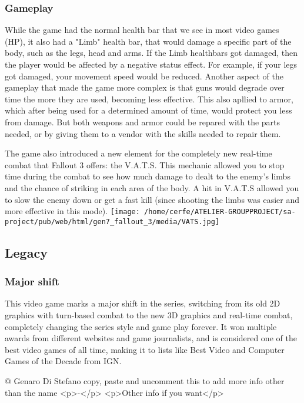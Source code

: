 \documentclass[a4paper,10pt]{book}
\begin{document}
 \subsubsection{Gameplay }
 
          While the game had the normal health bar that we see in most video games (HP), it also had a "Limb" health bar, that would damage a specific part of the body, such as the legs, head and arms. If the Limb healthbars got damaged, then the player would be affected by a negative status effect. For example, if your legs got damaged, your movement speed would be reduced. Another aspect of the gameplay that made the game more complex is that guns would degrade over time the more they are used, becoming less effective. This also apllied to armor, which after being used for a determined amount of time, would protect you less from damage. But both weapons and armor could be repared with the parts needed, or by giving them to a vendor with the skills needed to repair them.
         
 The game also introduced a new element for the completely new real-time combat that Fallout 3 offers: the V.A.T.S. This mechanic allowed you to stop time during the combat to see how much damage to dealt to the enemy's limbs and the chance of striking in each area of the body. A hit in V.A.T.S allowed you to slow the enemy down or get a fast kill (since shooting the limbs was easier and more effective in this mode). 
 \texttt{[image: /home/cerfe/ATELIER-GROUPPROJECT/sa-project/pub/web/html/gen7\_fallout\_3/media/VATS.jpg]}  
 \subsection{Legacy }
 \subsubsection{Major shift }
 
        This video game marks a major shift in the series, switching from its old 2D graphics with turn-based combat to the new 3D graphics and real-time combat, completely changing the series style and game play forever. It won multiple awards from different websites and game journalists, and is considered one of the best video games of all time, making it to lists like Best Video and Computer Games of the Decade from IGN.
         
 
 @ Genaro Di Stefano 
  copy, paste and uncomment this to add more info other than the name
            <p>-</p>
            <p>Other info if you want</p>
           
\end{document}
